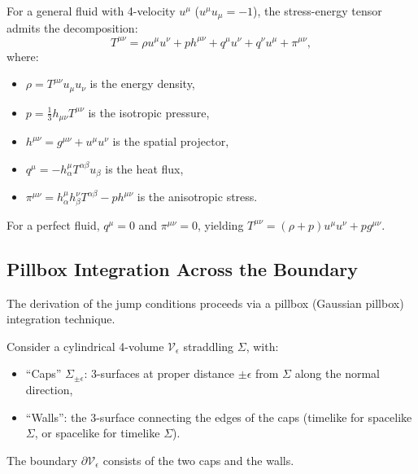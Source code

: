 \begin{proposition}
\label{prop:stress_decomposition}
For a general fluid with 4-velocity $u^\mu$ ($u^\mu u_\mu = -1$), the stress-energy tensor admits the decomposition:
\begin{equation}
\label{eq:stress_decomposition}
T^{\mu\nu} = \rho u^\mu u^\nu + p h^{\mu\nu} + q^\mu u^\nu + q^\nu u^\mu + \pi^{\mu\nu},
\end{equation}
where:
\begin{itemize}
    \item $\rho = T^{\mu\nu} u_\mu u_\nu$ is the energy density,
    \item $p = \frac{1}{3} h_{\mu\nu} T^{\mu\nu}$ is the isotropic pressure,
    \item $h^{\mu\nu} = g^{\mu\nu} + u^\mu u^\nu$ is the spatial projector,
    \item $q^\mu = -h^\mu_\alpha T^{\alpha\beta} u_\beta$ is the heat flux,
    \item $\pi^{\mu\nu} = h^\mu_\alpha h^\nu_\beta T^{\alpha\beta} - p h^{\mu\nu}$ is the anisotropic stress.
\end{itemize}
For a perfect fluid, $q^\mu = 0$ and $\pi^{\mu\nu} = 0$, yielding $T^{\mu\nu} = (\rho + p) u^\mu u^\nu + p g^{\mu\nu}$.
\end{proposition}

\subsection{Pillbox Integration Across the Boundary}
\label{app:pillbox}

The derivation of the jump conditions proceeds via a pillbox (Gaussian pillbox) integration technique.

\begin{definition}
Consider a cylindrical 4-volume $\mathcal{V}_\epsilon$ straddling $\Sigma$, with:
\begin{itemize}
    \item ``Caps'' $\Sigma_{\pm\epsilon}$: 3-surfaces at proper distance $\pm\epsilon$ from $\Sigma$ along the normal direction,
    \item ``Walls'': the 3-surface connecting the edges of the caps (timelike for spacelike $\Sigma$, or spacelike for timelike $\Sigma$).
\end{itemize}
The boundary $\partial \mathcal{V}_\epsilon$ consists of the two caps and the walls.
\end{definition}

